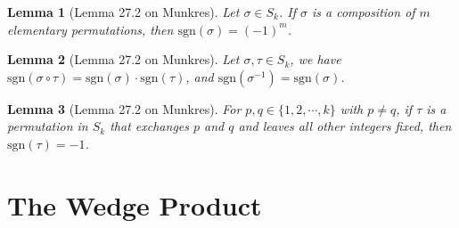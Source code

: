 \documentclass[15pt]{book}
\theoremstyle{break}
\theoremstyle{break}
\newtheorem{lem}{Lemma}[thm]
\newcommand{\sgn}{\text{sgn}}
\begin{document}
\begin{lem}[Lemma 27.2 on Munkres]
Let $\sigma \in S_k$. If $\sigma $ is a composition of $m$ elementary permutations, then $\sgn (\sigma) = (-1)^m$.
\end{lem}

\begin{lem}[Lemma 27.2 on Munkres]
Let $\sigma ,\tau \in S_k$, we have $\sgn(\sigma\circ \tau) = \sgn(\sigma) \cdot \sgn(\tau)$, and $\sgn(\sigma^{-1}) = \sgn(\sigma)$. 
\end{lem}

\begin{lem}[Lemma 27.2 on Munkres]
For $p,q \in \{1,2,\cdots, k\}$ with $p \neq q$, if $\tau$ is a permutation in $S_k$ that exchanges $p$ and $q$ and leaves all other integers fixed, then $\sgn(\tau) = -1$. 
\end{lem}


\newpage
\section[The Wedge Product]{\color{red}The Wedge Product\color{black}}
\end{document}
